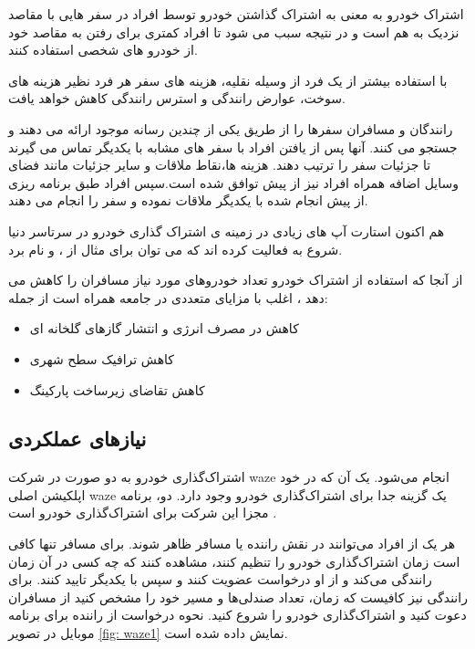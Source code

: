 اشتراک خودرو به معنی به اشتراک گذاشتن خودرو توسط افراد در سفر هایی با مقاصد نزدیک به هم است و در نتیجه سبب می شود تا افراد کمتری برای رفتن به مقاصد خود از خودرو های شخصی استفاده کنند.

با استفاده بیشتر از یک فرد از وسیله نقلیه، هزینه های سفر هر فرد نظیر  هزینه های سوخت، عوارض رانندگی و استرس رانندگی کاهش خواهد یافت.

رانندگان و مسافران سفرها را از طریق یکی از چندین رسانه موجود ارائه می دهند و جستجو می کنند. آنها پس از یافتن افراد با سفر های مشابه با یکدیگر تماس می گیرند تا جزئیات سفر را ترتیب دهند. هزینه ها،‌نقاط ملاقات و سایر جزئیات مانند فضای وسایل اضافه همراه افراد نیز از پیش توافق شده است.‌‌سپس افراد طبق برنامه ریزی از پیش انجام شده با یکدیگر ملاقات نموده و سفر را انجام می دهند.

هم اکنون استارت آپ های زیادی در زمینه ی اشتراک گذاری خودرو در سرتاسر دنیا شروع به فعالیت کرده اند که می توان برای مثال از  ،  و  نام برد.

از آنجا که استفاده از اشتراک خودرو تعداد خودر‌و‌های مورد نیاز مسافران را کاهش می دهد ، اغلب با مزایای متعددی در جامعه همراه است از جمله: 
\begin{itemize}
\item
کاهش در مصرف انرژی و انتشار گازهای گلخانه ای
\item
کاهش ترافیک سطح شهری
\item
کاهش تقاضای زیرساخت پارکینگ
\end{itemize}

\subsection{نیازهای عملکردی }
اشتراک‌گذاری خودرو به دو صورت در شرکت waze انجام می‌شود. یک آن که در خود اپلکیشن اصلی waze یک گزینه جدا برای اشتراک‌گذاری خودرو وجود دارد. دو، برنامه مجزا این شرکت برای اشتراک‌گذاری خودرو است \cite{waze_carpool} .

هر یک از افراد می‌توانند در نقش راننده یا مسافر ظاهر شوند. برای مسافر تنها کافی است زمان اشتراک‌گذاری خودرو را تنظیم کنند، مشاهده کنند که چه کسی در آن زمان رانندگی می‌کند و از او درخواست عضویت کنند و سپس با یکدیگر تایید کنند.
برای رانندگی نیز کافیست که زمان، تعداد صندلی‌ها و مسیر خود را مشخص کنید از مسافران دعوت کنید و اشتراک‌گذاری خودرو را شروع کنید. نحوه درخواست از راننده برای برنامه موبایل در تصویر \ref{fig: waze1} نمایش داده شده است.


